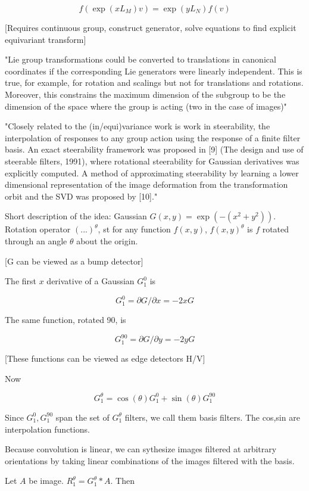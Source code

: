 \documentclass[english]{article}
\begin{document}
$$f(\exp(xL_M)v) = \exp(yL_N)f(v)$$

[Requires continuous group, construct generator, solve equations to find explicit equivariant transform]

"Lie group transformations could be converted to translations in
canonical coordinates if the corresponding Lie generators were linearly independent. This is true, for example, for rotation and scalings but not for translations and rotations. Moreover, this constrains the maximum
dimension of the subgroup to be the dimension of the space where the group is acting (two in the case of images)"

\item "Closely related to the (in/equi)variance work is work in steerability, the interpolation of responses to any
group action using the response of a finite filter basis. An exact steerability framework was proposed in [9] (The design and use of steerable filters, 1991),
where rotational steerability for Gaussian derivatives was explicitly computed. A method of approximating steerability by learning a lower dimensional representation of the image deformation from the transformation
orbit and the SVD was proposed by [10]."


Short description of the idea: Gaussian $G(x,y) = \exp(-(x^2+y^2))$. Rotation operator $(...)^\theta$, st for any function $f(x,y)$, $f(x,y)^\theta$ is $f$ rotated through an angle $\theta$ about the origin. 

[G can be viewed as a bump detector]

The first $x$ derivative of a Gaussian $G_1^0$ is 

$$G_1^0 = \partial G/\partial x = -2x G$$

The same function, rotated 90, is 

$$G_1^{90} = \partial G/\partial y = -2y G$$

[These functions can be viewed as edge detectors H/V]

Now 

$$G_1^{\theta} = \cos(\theta) G_1^0 + \sin(\theta) G_1^{90} $$

Since $G_1^0, G_1^{90}$ span the set of $G_1^{\theta}$ filters, we call them basis filters. The cos,sin are interpolation functions.

Because convolution is linear, we can sythesize images filtered at arbitrary orientations by taking linear combinations of the images filtered with the basis. 

Let $A$ be image. $R_1^{\theta} = G_1^{\theta}*A$. Then 
\end{document}

